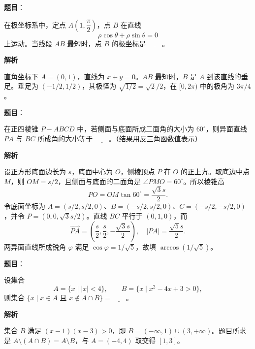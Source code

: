 \begin{answer}

\textbf{题目}：

在极坐标系中，定点 \(A\left(1,\dfrac{\pi}{2}\right)\)，点 \(B\) 在直线
\nopagebreak[4]
\[
   \rho\cos\theta+\rho\sin\theta=0
\]
   上运动。当线段 \(AB\) 最短时，点 \(B\) 的极坐标是 \(\underline{\qquad}\)。

\textbf{解析}

直角坐标下 \(A=(0,1)\)，直线为 \(x+y=0\)。\(AB\) 最短时，\(B\) 是 \(A\) 到该直线的垂足。垂足为 \((-1/2,1/2)\)，其极径为 \(\sqrt{1/2}=\sqrt2/2\)，在 \([0,2\pi)\) 中的极角为 \(3\pi/4\)。


\end{answer}
\begin{answer}

\textbf{题目}：

在正四棱锥 \(P-ABCD\) 中，若侧面与底面所成二面角的大小为 \(60^\circ\)，则异面直线 \(PA\) 与 \(BC\) 所成角的大小等于 \(\underline{\qquad}\)。（结果用反三角函数值表示）

\textbf{解析}

设正方形底面边长为 \(s\)，底面中心为 \(O\)，侧棱顶点 \(P\) 在 \(O\) 的正上方。取底边中点 \(M\)，则 \(OM=s/2\)，且侧面与底面的二面角是 \(\angle PMO=60^\circ\)。所以棱锥高
\nopagebreak[4]
\[
PO=OM\tan60^\circ=\frac{\sqrt3s}{2}.
\]
令底面坐标为 \(A=(s/2,s/2,0)\)、\(B=(-s/2,s/2,0)\)、\(C=(-s/2,-s/2,0)\)，并令 \(P=(0,0,\sqrt3s/2)\)。直线 \(BC\) 平行于 \((0,1,0)\)，而
\nopagebreak[4]
\[
\overrightarrow{PA}=\left(\frac s2,\frac s2,-\frac{\sqrt3s}{2}\right),
\quad |PA|=\frac{\sqrt5s}{2}.
\]
两异面直线所成锐角 \(\varphi\) 满足 \(\cos\varphi=1/\sqrt5\)，故填 \(\arccos(1/\sqrt5)\)。


\end{answer}
\begin{answer}

\textbf{题目}：

设集合
\nopagebreak[4]
\[
   A=\{x\mid |x|<4\},\qquad B=\{x\mid x^2-4x+3>0\},
\]
   则集合 \(\{x\mid x\in A\text{ 且 }x\notin A\cap B\}=\underline{\qquad}\)。

\textbf{解析}

集合 \(B\) 满足 \((x-1)(x-3)>0\)，即 \(B=(-\infty,1)\cup(3,+\infty)\)。题目所求是 \(A\setminus(A\cap B)=A\setminus B\)，与 \(A=(-4,4)\) 取交得 \([1,3]\)。


\end{answer}
